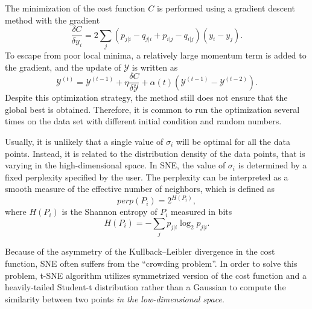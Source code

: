 The minimization of the cost function $C$ is performed using a gradient descent method with the gradient
\begin{equation}
	\frac{\delta C}{\delta y_i}=2\sum_j(p_{j|i}-q_{j|i}+p_{i|j}-q_{i|j})(y_i-y_j).
\end{equation}
To escape from poor local minima, a relatively large momentum term is added to the gradient, and the update of $\mathcal{Y}$ is written as
\begin{equation}
  \mathcal{Y}^{(t)}=\mathcal{Y}^{(t-1)}+\eta \frac{\delta C}{\delta \mathcal{Y}}+\alpha(t)(\mathcal{Y}^{(t-1)}-\mathcal{Y}^{(t-2)}).
\end{equation}  
Despite this optimization strategy, the method still does not ensure that the global best is obtained. Therefore, it is common to run the optimization several times on the data set with different initial condition and random numbers.

Usually, it is unlikely that a single value of $\sigma_i$ will be optimal for all the data points. Instead, it is related to the distribution density of the data points, that is varying in the high-dimensional space. In SNE, the value of $\sigma_i$ is determined by a fixed perplexity specified by the user. The perplexity can be interpreted as a smooth measure of the effective number of neighbors, which is defined as
\begin{equation}
	perp(P_i)=2^{H(P_i)},
\end{equation} 
where $H(P_i)$ is the Shannon entropy of $P_i$ measured in bits
\begin{equation}
	H(P_i)=-\sum_j p_{j|i}\log_2{p_{j|i}}.
\end{equation}

Because of the asymmetry of the Kullback--Leibler divergence in the cost function, SNE often suffers from the ``crowding problem''. In order to solve this problem, t-SNE algorithm utilizes symmetrized version of the cost function and a heavily-tailed Student-t distribution rather than a Gaussian to compute the similarity between two points \textit{in the low-dimensional space}. 

